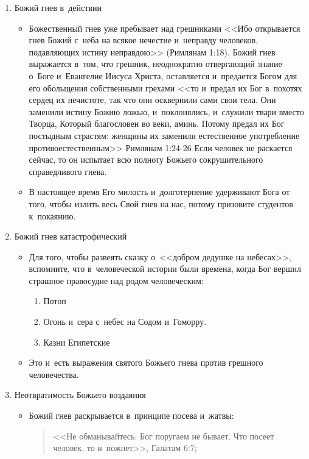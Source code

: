 \documentclass[a4paper,12pt]{article}
\begin{document}
\begin{enumerate}    

    \item Божий гнев в~действии
    \begin{itemize}
        \item Божественный гнев уже пребывает над грешниками  <<Ибо открывается гнев Божий с~неба на всякое нечестие и~неправду человеков, подавляющих истину неправдою>> (Римлянам 1:18). Божий гнев выражается в~том, что грешник, неоднократно отвергающий знание о~Боге и~Евангелие Иисуса Христа, оставляется и~предается Богом для его обольщения собственными грехами  <<то и~предал их Бог в~похотях сердец их нечистоте, так что они осквернили сами свои тела. Они заменили истину Божию ложью, и~поклонялись, и~служили твари вместо Творца, Который благословен во веки, аминь. Потому предал их Бог постыдным страстям: женщины их заменили естественное употребление противоестественным>> Римлянам 1:24-26 Если человек не раскается сейчас, то он испытает всю полноту Божьего сокрушительного справедливого гнева. 
        \item В настоящее время Его милость и~долготерпение удерживают Бога от того, чтобы излить весь Свой гнев на нас, потому призовите студентов к~покаянию.
    \end{itemize}
    \item Божий гнев катастрофический
	\begin{itemize}
        \item Для того, чтобы развеять сказку о~<<добром дедушке на небесах>>, вспомните, что в~человеческой истории были времена, когда Бог вершил страшное правосудие над родом человеческим:
        \begin{enumerate}
                \item Потоп
                \item Огонь и~сера с~небес на Содом и~Гоморру. 
                \item Казни Египетские
        \end{enumerate}
        \item Это и~есть выражения святого Божьего гнева против грешного человечества.
    \end{itemize}
    \item Неотвратимость Божьего воздаяния 
    \begin{itemize}
        \item Божий гнев раскрывается в~принципе посева и~жатвы:
        \begin{quote}
            <<Не обманывайтесь: Бог поругаем не бывает. Что посеет человек, то и~пожнет>>, Галатам 6:7;

\end{quote}
\end{itemize}
\end{enumerate}
\end{document}
